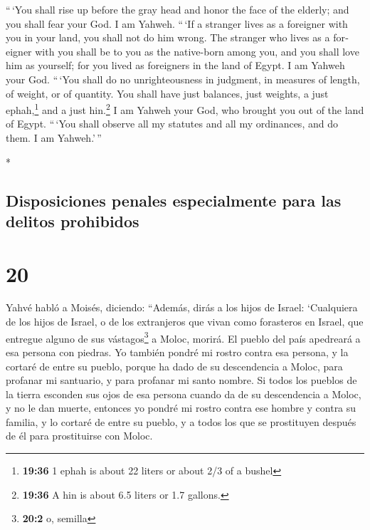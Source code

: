 \begin{paracol}{2}
\begin{otherlanguage}{english}
 ``\,`You shall rise up before the gray head and honor
the face of the elderly; and you shall fear your God. I am Yahweh.
 ``\,`If a stranger lives as a foreigner with you in your
land, you shall not do him wrong.  The stranger who lives
as a foreigner with you shall be to you as the native-born among you,
and you shall love him as yourself; for you lived as foreigners in the
land of Egypt. I am Yahweh your God.  ``\,`You shall do
no unrighteousness in judgment, in measures of length, of weight, or of
quantity.  You shall have just balances, just weights, a
just ephah,\footnote{\textbf{19:36} 1 ephah is about 22 liters or about
  2/3 of a bushel} and a just hin.\footnote{\textbf{19:36} A hin is
  about 6.5 liters or 1.7 gallons.} I am Yahweh your God, who brought
you out of the land of Egypt.  ``\,`You shall observe all
my statutes and all my ordinances, and do them. I am Yahweh.'\,''

\end{otherlanguage}

\switchcolumn[0]*

\hypertarget{disposiciones-penales-especialmente-para-las-delitos-prohibidos}{%
\subsection{Disposiciones penales especialmente para las delitos
prohibidos}\label{disposiciones-penales-especialmente-para-las-delitos-prohibidos}}

\hypertarget{section-38}{%
\section{20}\label{section-38}}

 Yahvé habló a Moisés, diciendo:  ``Además,
dirás a los hijos de Israel: `Cualquiera de los hijos de Israel, o de
los extranjeros que vivan como forasteros en Israel, que entregue alguno
de sus vástagos\footnote{\textbf{20:2} o, semilla} a Moloc, morirá. El
pueblo del país apedreará a esa persona con piedras.  Yo
también pondré mi rostro contra esa persona, y la cortaré de entre su
pueblo, porque ha dado de su descendencia a Moloc, para profanar mi
santuario, y para profanar mi santo nombre.  Si todos los
pueblos de la tierra esconden sus ojos de esa persona cuando da de su
descendencia a Moloc, y no le dan muerte,  entonces yo
pondré mi rostro contra ese hombre y contra su familia, y lo cortaré de
entre su pueblo, y a todos los que se prostituyen después de él para
prostituirse con Moloc.


\end{paracol}
